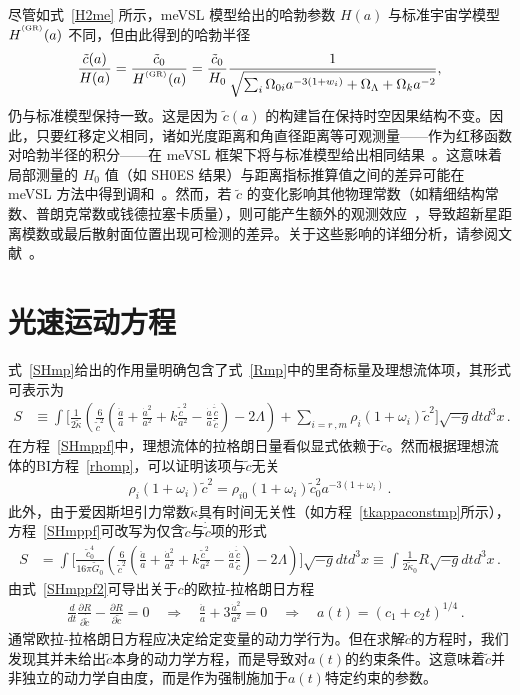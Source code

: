 \documentclass[jkps,preprint,fleqn]{revtex4}
\newcommand{\tc}{\tilde{c}}
\newcommand{\tG}{\tilde{G}}
\newcommand{\GR}{\text{GR}}
\newcommand{\tkapp}{\tilde{\kappa}}
\begin{document}
\begin{CJK*}{UTF8}{gbsn}
尽管如式~\eqref{H2me} 所示，meVSL 模型给出的哈勃参数 $H(a)$ 与标准宇宙学模型 $H^{\textsuperscript{\tiny (\GR)}}(a)$ 不同，但由此得到的哈勃半径
\begin{equation}
    \frac{\tilde{c}(a)}{H(a)}  = \frac{\tc_0}{H^{\textsuperscript{\tiny (\GR)}}(a)} = \frac{\tilde{c}_0}{H_0} \frac{1}{\sqrt{\sum_i \Omega_{0i} a^{-3(1+w_i)} + \Omega_\Lambda + \Omega_k a^{-2}}},
\end{equation}
仍与标准模型保持一致。这是因为 $\tilde{c}(a)$ 的构建旨在保持时空因果结构不变。因此，只要红移定义相同，诸如光度距离和角直径距离等可观测量——作为红移函数对哈勃半径的积分——在 meVSL 框架下将与标准模型给出相同结果~\cite{Lee:2020zts}。这意味着局部测量的 $H_0$ 值（如 SH0ES 结果）与距离指标推算值之间的差异可能在 meVSL 方法中得到调和~\cite{Lee:2024nya}。然而，若 $\tilde{c}$ 的变化影响其他物理常数（如精细结构常数、普朗克常数或钱德拉塞卡质量），则可能产生额外的观测效应~\cite{Lee:2020zts,Lee:2021xwh}，导致超新星距离模数或最后散射面位置出现可检测的差异。关于这些影响的详细分析，请参阅文献~\cite{Lee:2020zts}。
\section{光速运动方程}
\label{sec:sol}

式~\eqref{SHmp}给出的作用量明确包含了式~\eqref{Rmp}中的里奇标量及理想流体项，其形式可表示为
\begin{align}
S &\equiv \int \Biggl[ \frac{1}{2 \tkapp} \left( \frac{6}{\tc^2} \left( \frac{\ddot{a}}{a} + \frac{\dot{a}^2}{a^2} + k \frac{\tc^2}{a^2} - \frac{\dot{a}}{a} \frac{\dot{\tc}}{ \tc} \right)  - 2 \Lambda \right) + \sum_{i=r\,,m} \rho_i (1 + \omega_i ) \tc^2 \Biggr] \sqrt{-g} dt d^3x \label{SHmppf} \,.
\end{align}
在方程~\eqref{SHmppf}中，理想流体的拉格朗日量看似显式依赖于$\tc$。然而根据理想流体的BI方程~\eqref{rhomp}，可以证明该项与$\tc$无关
\begin{align}
 \rho_i (1 + \omega_i ) \tc^2 =  \rho_{i0} (1 + \omega_i ) \tc_{0}^2 a^{-3(1 + \omega_i )}  \label{rhoi} \,.
\end{align}
此外，由于爱因斯坦引力常数$\tkapp$具有时间无关性（如方程~\eqref{tkappaconstmp}所示），方程~\eqref{SHmppf}可改写为仅含$\tc$与$\dot{\tc}$项的形式
\begin{align}
S &= \int \Biggl[ \frac{\tc_0^4}{16 \pi \tG_0} \left( \frac{6}{\tc^2} \left( \frac{\ddot{a}}{a} + \frac{\dot{a}^2}{a^2} + k \frac{\tc^2}{a^2} - \frac{\dot{a}}{a} \frac{\dot{\tc}}{ \tc} \right)  - 2 \Lambda \right)  \Biggr] \sqrt{-g} dt d^3x \equiv \int \frac{1}{2 \tkapp_0} R \sqrt{-g} dt d^3x \label{SHmppf2} \,.
\end{align}
由式~\eqref{SHmppf2}可导出关于$c$的欧拉-拉格朗日方程
\begin{align}
& \frac{d}{dt} \frac{\partial R}{\partial \dot{\tc}} - \frac{\partial R}{\partial \tc} = 0 \quad \Rightarrow \quad \frac{\ddot{a}}{a} + 3 \frac{\dot{a}^2}{a^2} = 0 \quad \Rightarrow \quad a(t) = (c_1 + c_2 t)^{1/4} \label{eomtc} \,.
\end{align}
通常欧拉-拉格朗日方程应决定给定变量的动力学行为。但在求解$\tc$的方程时，我们发现其并未给出$\tc$本身的动力学方程，而是导致对$a(t)$的约束条件。这意味着$\tc$并非独立的动力学自由度，而是作为强制施加于$a(t)$特定约束的参数。


\end{CJK*}
\end{document}
